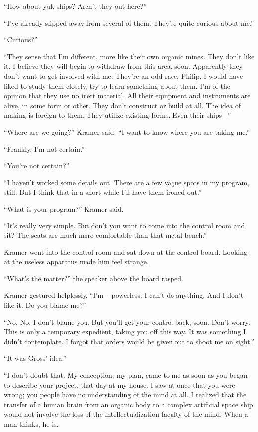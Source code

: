 \documentclass[12pt,a5paper]{book}
\newcommand{\storybreak}{%
  \par\vspace{0.6\baselineskip}
  \begin{center}\color{coveraccent}\small *\enspace *\enspace *\end{center}
  \vspace{0.3\baselineskip}\noindent\ignorespaces
}
\begin{document}
“How about yuk ships? Aren't they out here?”

“I've already slipped away from several of them. They're quite curious about me.”

“Curious?”

“They sense that I'm different, more like their own organic mines. They don't like it. I believe they will begin to withdraw from this area, soon. Apparently they don't want to get involved with me. They're an odd race, Philip. I would have liked to study them closely, try to learn something about them. I'm of the opinion that they use no inert material. All their equipment and instruments are alive, in some form or other. They don't construct or build at all. The idea of making is foreign to them. They utilize existing forms. Even their ships –”

“Where are we going?” Kramer said. “I want to know where you are taking me.”

“Frankly, I'm not certain.”

“You're not certain?”

“I haven't worked some details out. There are a few vague spots in my program, still. But I think that in a short while I'll have them ironed out.”

“What is your program?” Kramer said.

“It's really very simple. But don't you want to come into the control room and sit? The seats are much more comfortable than that metal bench.”

Kramer went into the control room and sat down at the control board. Looking at the useless apparatus made him feel strange.

“What's the matter?” the speaker above the board rasped.

\storybreak
Kramer gestured helplessly. “I'm – powerless. I can't do anything. And I don't like it. Do you blame me?”

“No. No, I don't blame you. But you'll get your control back, soon. Don't worry. This is only a temporary expedient, taking you off this way. It was something I didn't contemplate. I forgot that orders would be given out to shoot me on sight.”

“It was Gross' idea.”

“I don't doubt that. My conception, my plan, came to me as soon as you began to describe your project, that day at my house. I saw at once that you were wrong; you people have no understanding of the mind at all. I realized that the transfer of a human brain from an organic body to a complex artificial space ship would not involve the loss of the intellectualization faculty of the mind. When a man thinks, he is.
\end{document}
